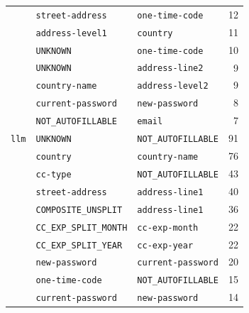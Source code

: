 \begin{tabular}{lllr}
 & \texttt{street-address} & \texttt{one-time-code} & 12 \\  %
 & \texttt{address-level1} & \texttt{country} & 11 \\  %
 & \texttt{UNKNOWN} & \texttt{one-time-code} & 10 \\  %
 & \texttt{UNKNOWN} & \texttt{address-line2} & 9 \\  %
 & \texttt{country-name} & \texttt{address-level2} & 9 \\  %
 & \texttt{current-password} & \texttt{new-password} & 8 \\  %
 & \texttt{NOT\_AUTOFILLABLE} & \texttt{email} & 7 \\  %
\midrule
\texttt{llm} & \texttt{UNKNOWN} & \texttt{NOT\_AUTOFILLABLE} & 91 \\  %
 & \texttt{country} & \texttt{country-name} & 76 \\  %
 & \texttt{cc-type} & \texttt{NOT\_AUTOFILLABLE} & 43 \\  %
 & \texttt{street-address} & \texttt{address-line1} & 40 \\  %
 & \texttt{COMPOSITE\_UNSPLIT} & \texttt{address-line1} & 36 \\  %
 & \texttt{CC\_EXP\_SPLIT\_MONTH} & \texttt{cc-exp-month} & 22 \\  %
 & \texttt{CC\_EXP\_SPLIT\_YEAR} & \texttt{cc-exp-year} & 22 \\  %
 & \texttt{new-password} & \texttt{current-password} & 20 \\  %
 & \texttt{one-time-code} & \texttt{NOT\_AUTOFILLABLE} & 15 \\  %
 & \texttt{current-password} & \texttt{new-password} & 14 \\  %
\bottomrule
\end{tabular}
